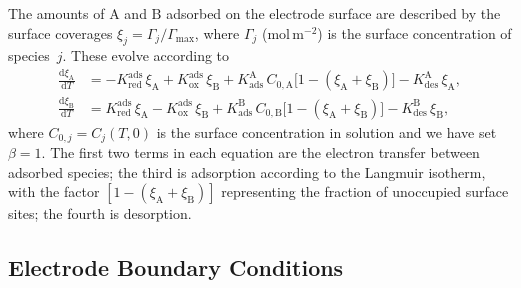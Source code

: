 The amounts of $\mathrm{A}$ and $\mathrm{B}$ adsorbed on the electrode
surface are described by the surface coverages $\xi_j =
\Gamma_j / \Gamma_{\mathrm{max}}$, where $\Gamma_j$
($\mathrm{mol\,m^{-2}}$) is the surface concentration of species~$j$.
These evolve according to
\begin{equation}\label{eq:ads-coverage-ode}
  \begin{aligned}
    \frac{\mathrm{d}\xi_\mathrm{A}}{\mathrm{d}T}
    &= -K_{\mathrm{red}}^{\mathrm{ads}}\,\xi_\mathrm{A}
    + K_{\mathrm{ox}}^{\mathrm{ads}}\,\xi_\mathrm{B}
    + K_{\mathrm{ads}}^{\mathrm{A}}\,C_{0,\mathrm{A}}
    \bigl[1 - (\xi_\mathrm{A} + \xi_\mathrm{B})\bigr]
    - K_{\mathrm{des}}^{\mathrm{A}}\,\xi_\mathrm{A}, \\[4pt]
    \frac{\mathrm{d}\xi_\mathrm{B}}{\mathrm{d}T}
    &= K_{\mathrm{red}}^{\mathrm{ads}}\,\xi_\mathrm{A}
    - K_{\mathrm{ox}}^{\mathrm{ads}}\,\xi_\mathrm{B}
    + K_{\mathrm{ads}}^{\mathrm{B}}\,C_{0,\mathrm{B}}
    \bigl[1 - (\xi_\mathrm{A} + \xi_\mathrm{B})\bigr]
    - K_{\mathrm{des}}^{\mathrm{B}}\,\xi_\mathrm{B},
  \end{aligned}
\end{equation}
where $C_{0,j} = C_j(T, 0)$ is the surface concentration in solution
and we have set $\beta = 1$.
The first two terms in each equation are the electron transfer between
adsorbed species; the third is adsorption according to the Langmuir
isotherm, with the factor $[1 - (\xi_\mathrm{A} + \xi_\mathrm{B})]$
representing the fraction of unoccupied surface sites; the fourth is
desorption.

\subsection{Electrode Boundary Conditions}

